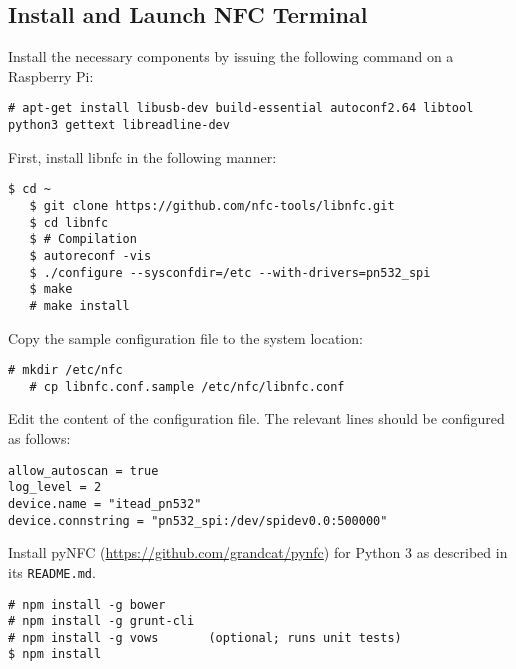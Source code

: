 \subsection{Install and Launch NFC Terminal}
Install the necessary components by issuing the following command on a Raspberry Pi:
\begin{lstlisting}[breaklines=true]
   # apt-get install libusb-dev build-essential autoconf2.64 libtool python3 gettext libreadline-dev
\end{lstlisting}
%
First, install libnfc in the following manner:
\begin{lstlisting}[breaklines=true]
   $ cd ~
   $ git clone https://github.com/nfc-tools/libnfc.git
   $ cd libnfc
   $ # Compilation
   $ autoreconf -vis
   $ ./configure --sysconfdir=/etc --with-drivers=pn532_spi
   $ make
   # make install
\end{lstlisting}
Copy the sample configuration file to the system location:
\begin{lstlisting}[breaklines=true]
   # mkdir /etc/nfc
   # cp libnfc.conf.sample /etc/nfc/libnfc.conf
\end{lstlisting}


%
Edit the content of the configuration file. The relevant lines should be configured as follows:
\begin{lstlisting}[breaklines=true]
allow_autoscan = true
log_level = 2
device.name = "itead_pn532"
device.connstring = "pn532_spi:/dev/spidev0.0:500000"
\end{lstlisting}
%
Install pyNFC (\url{https://github.com/grandcat/pynfc}) for Python 3 as described in its \texttt{README.md}.


%
%
%
%
%




\begin{lstlisting}
# npm install -g bower
# npm install -g grunt-cli
# npm install -g vows		(optional; runs unit tests)
$ npm install
\end{lstlisting}

